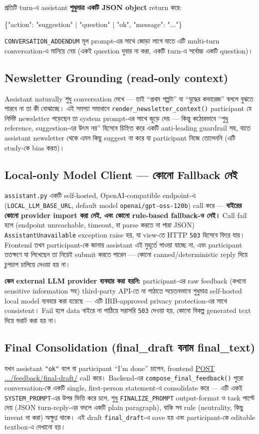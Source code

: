 \documentclass[11pt,a4paper]{article}
\newcommand{\code}[1]{\texttt{\small #1}}
\newcommand{\summarybox}[1]{%
  \begin{center}
  \colorbox{softbg}{\parbox{0.94\textwidth}{#1}}
  \end{center}
}
\begin{document}
প্রতিটি turn-এ assistant \textbf{শুধুমাত্র একটি JSON object} return করে:
\begin{center}
\small\ttfamily \{"action": "suggestion" $\vert$ "question" $\vert$ "ok", "message": "..."\}
\end{center}
\code{CONVERSATION\_ADDENDUM} মূল prompt-এর সাথে জোড়া লাগে যাতে এটি multi-turn
conversation-এ মানিয়ে নেয় (একই question দুবার না করা, একটি turn-এ সর্বোচ্চ একটি question)।

\subsection{Newsletter Grounding (read-only context)}
Assistant naturally শুধু conversation দেখে --- তাই ``প্রথম গল্পটা'' বা ``যুদ্ধের কভারেজ''
বললে বুঝতে পারবে না তা কী বোঝাচ্ছে। এই সমস্যা সমাধানে \code{render\_newsletter\_context()}
participant যে নির্দিষ্ট newsletter পড়েছেন তা system prompt-এর সাথে জুড়ে দেয় --- কিন্তু
কঠোরভাবে ``শুধু reference, suggestion-এর উৎস নয়'' হিসেবে চিহ্নিত করে একটি anti-leading
guardrail সহ, যাতে assistant newsletter থেকে এমন কিছু suggest না করে যা participant নিজে
তোলেননি (এটি study-কে bias করত)।

\subsection{Local-only Model Client --- কোনো Fallback নেই}
\code{assistant.py} একটি self-hosted, OpenAI-compatible endpoint-এ (\code{LOCAL\_LLM\_BASE\_URL},
default model \code{openai/gpt-oss-120b}) call করে --- \textbf{বাইরের কোনো provider import
করা নেই, এবং কোনো rule-based fallback-ও নেই।} Call fail হলে (endpoint unreachable, timeout,
বা parse করতে না পারা JSON) \code{AssistantUnavailable} exception raise হয়, যা view-তে
HTTP \code{503} হিসেবে ফিরে যায়। Frontend তখন participant-কে জানায় assistant এই মুহূর্তে
পাওয়া যাচ্ছে না, এবং participant ততক্ষণে যা লিখেছেন তা নিয়েই submit করতে পারেন --- কোনো
canned/deterministic reply দিয়ে চুপচাপ চালিয়ে দেওয়া হয় না।

\summarybox{%
  \textbf{কেন external LLM provider ব্যবহার করা হয়নি:} participant-এর raw feedback (কখনো
  sensitive information সহ) third-party API-তে না পাঠাতে সচেতনভাবে শুধুমাত্র self-hosted
  local model ব্যবহার করা হয়েছে --- এটি IRB-approved privacy protection-এর সাথে consistent।
  Fail হলে data বাইরে না পাঠিয়ে সরাসরি \code{503} দেওয়া হয়, কোনো বিকল্প generated text দিয়ে
  ভরাট করা হয় না।
}

\subsection{Final Consolidation (final\_draft বনাম final\_text)}
যখন assistant \code{"ok"} বলে বা participant ``I'm done'' চাপেন, frontend
\url{POST .../feedback/final-draft/} call করে। Backend-এর \code{compose\_final\_feedback()}
পুরো conversation-কে একটি single, first-person statement-এ consolidate করে --- এটি একই
\code{SYSTEM\_PROMPT}-এর উপর ভিত্তি করে চলে, শুধু \code{FINALIZE\_PROMPT} output-format ও
task পাল্টে দেয় (JSON turn-reply-এর বদলে একটি plain paragraph), বাকি সব rule (neutrality,
কিছু invent না করা) অক্ষুণ্ণ থাকে। এই draft \code{final\_draft}-এ save হয় এবং participant-কে
editable textbox-এ দেখানো হয়।
\end{document}
